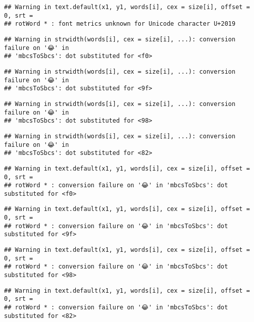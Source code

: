 \documentclass[
]{article}
\begin{document}
\begin{verbatim}
## Warning in text.default(x1, y1, words[i], cex = size[i], offset = 0, srt =
## rotWord * : font metrics unknown for Unicode character U+2019
\end{verbatim}

\begin{verbatim}
## Warning in strwidth(words[i], cex = size[i], ...): conversion failure on '😂' in
## 'mbcsToSbcs': dot substituted for <f0>
\end{verbatim}

\begin{verbatim}
## Warning in strwidth(words[i], cex = size[i], ...): conversion failure on '😂' in
## 'mbcsToSbcs': dot substituted for <9f>
\end{verbatim}

\begin{verbatim}
## Warning in strwidth(words[i], cex = size[i], ...): conversion failure on '😂' in
## 'mbcsToSbcs': dot substituted for <98>
\end{verbatim}

\begin{verbatim}
## Warning in strwidth(words[i], cex = size[i], ...): conversion failure on '😂' in
## 'mbcsToSbcs': dot substituted for <82>
\end{verbatim}

\begin{verbatim}
## Warning in text.default(x1, y1, words[i], cex = size[i], offset = 0, srt =
## rotWord * : conversion failure on '😂' in 'mbcsToSbcs': dot substituted for <f0>
\end{verbatim}

\begin{verbatim}
## Warning in text.default(x1, y1, words[i], cex = size[i], offset = 0, srt =
## rotWord * : conversion failure on '😂' in 'mbcsToSbcs': dot substituted for <9f>
\end{verbatim}

\begin{verbatim}
## Warning in text.default(x1, y1, words[i], cex = size[i], offset = 0, srt =
## rotWord * : conversion failure on '😂' in 'mbcsToSbcs': dot substituted for <98>
\end{verbatim}

\begin{verbatim}
## Warning in text.default(x1, y1, words[i], cex = size[i], offset = 0, srt =
## rotWord * : conversion failure on '😂' in 'mbcsToSbcs': dot substituted for <82>
\end{verbatim}
\end{document}
